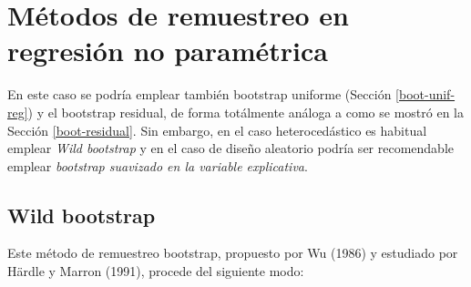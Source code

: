 \documentclass[
]{book}
\theoremstyle{break}
\theoremstyle{definition}
\theoremstyle{definition}
\theoremstyle{definition}
\theoremstyle{definition}
\theoremstyle{remark}
\begin{document}
\hypertarget{muxe9todos-de-remuestreo-en-regresiuxf3n-no-paramuxe9trica}{%
\section{Métodos de remuestreo en regresión no paramétrica}\label{muxe9todos-de-remuestreo-en-regresiuxf3n-no-paramuxe9trica}}

En este caso se podría emplear también bootstrap uniforme (Sección \ref{boot-unif-reg}) y el bootstrap residual, de forma totálmente análoga a como se mostró en la Sección \ref{boot-residual}.
Sin embargo, en el caso heterocedástico es habitual emplear \emph{Wild bootstrap} y en el caso de diseño aleatorio podría ser recomendable emplear \emph{bootstrap suavizado en la variable explicativa}.

\hypertarget{wild-bootstrap}{%
\subsection{Wild bootstrap}\label{wild-bootstrap}}

Este método de remuestreo bootstrap, propuesto por Wu (1986) y estudiado
por Härdle y Marron (1991), procede del siguiente modo:
\end{document}
